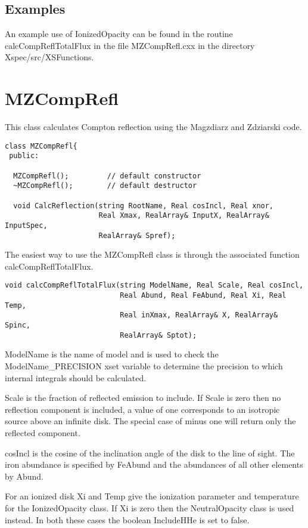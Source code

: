 \documentclass[11pt]{book}
\begin{document}
\section{Examples}

An example use of IonizedOpacity can be found in the routine
calcCompReflTotalFlux in the file MZCompRefl.cxx in the directory 
Xspec/src/XSFunctions.

\chapter{MZCompRefl}

This class calculates Compton reflection using the Magzdiarz and
Zdziarski code. 

\begin{verbatim}
class MZCompRefl{
 public:

  MZCompRefl();         // default constructor
  ~MZCompRefl();        // default destructor

  void CalcReflection(string RootName, Real cosIncl, Real xnor, 
                      Real Xmax, RealArray& InputX, RealArray& InputSpec, 
                      RealArray& Spref);
\end{verbatim}

The easiest way to use the MZCompRefl class is through the associated
function calcCompReflTotalFlux.

\begin{verbatim}
void calcCompReflTotalFlux(string ModelName, Real Scale, Real cosIncl, 
                           Real Abund, Real FeAbund, Real Xi, Real Temp, 
                           Real inXmax, RealArray& X, RealArray& Spinc, 
                           RealArray& Sptot);
\end{verbatim}

ModelName is the name of model and is used to check the
ModelName\_PRECISION xset variable to determine the precision to which
internal integrals should be calculated. 

Scale is the fraction of reflected emission to include. If Scale is
zero then no reflection component is included, a value of one
corresponds to an isotropic source above an infinite disk. The special
case of minus one will return only the reflected component.

cosIncl is the cosine of the inclination angle of the disk to the line
of sight. The iron abundance is specified by FeAbund and the
abundances of all other elements by Abund.

For an ionized disk Xi and Temp give the ionization parameter and
temperature for the IonizedOpacity class. If Xi is zero then the
NeutralOpacity class is used instead. In both these cases the boolean
IncludeHHe is set to false.
\end{document}
